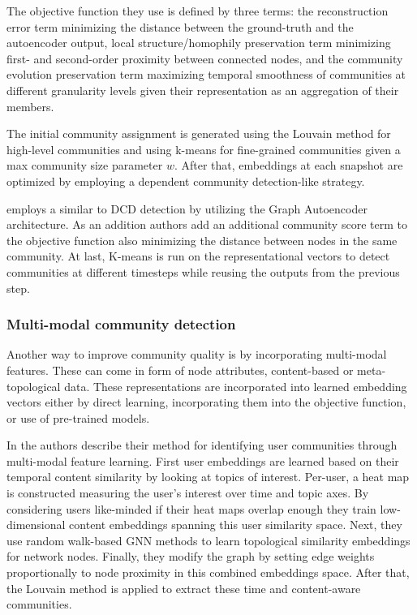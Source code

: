 \documentclass[
acmsmall,
nonacm,
screen,
acmthm]{acmart}
\begin{document}
The objective function they use is defined by three terms: the
reconstruction error term minimizing the distance between the
ground-truth and the autoencoder output, local structure/homophily
preservation term minimizing first- and second-order proximity between
connected nodes, and the community evolution preservation term
maximizing temporal smoothness of communities at different granularity
levels given their representation as an aggregation of their members.

The initial community assignment is generated using the Louvain method
for high-level communities and using k-means for fine-grained
communities given a max community size parameter \(w\). After that,
embeddings at each snapshot are optimized by employing a dependent
community detection-like strategy.

\citet{wangEvolutionaryAutoencoderDynamic2020} employs a similar to DCD
detection by utilizing the Graph Autoencoder architecture. As an
addition authors add an additional community score term to the objective
function also minimizing the distance between nodes in the same
community. At last, K-means is run on the representational vectors to
detect communities at different timesteps while reusing the outputs from
the previous step.

\hypertarget{multi-modal-community-detection}{%
\subsubsection{Multi-modal community
detection}\label{multi-modal-community-detection}}

Another way to improve community quality is by incorporating multi-modal
features. These can come in form of node attributes, content-based or
meta-topological data. These representations are incorporated into
learned embedding vectors either by direct learning, incorporating them
into the objective function, or use of pre-trained models.

In \citet{faniUserCommunityDetection2020} the authors describe their
method for identifying user communities through multi-modal feature
learning. First user embeddings are learned based on their temporal
content similarity by looking at topics of interest. Per-user, a heat
map is constructed measuring the user's interest over time and topic
axes. By considering users like-minded if their heat maps overlap enough
they train low-dimensional content embeddings spanning this user
similarity space. Next, they use random walk-based GNN methods to learn
topological similarity embeddings for network nodes. Finally, they
modify the graph by setting edge weights proportionally to node
proximity in this combined embeddings space. After that, the Louvain
method is applied to extract these time and content-aware communities.
\end{document}

